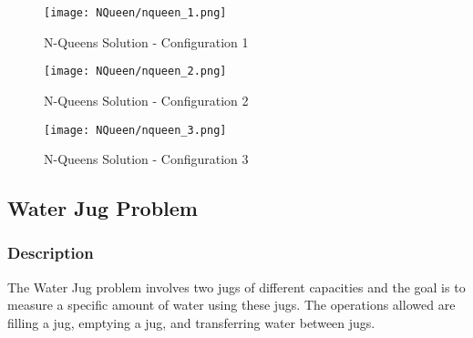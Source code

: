 \documentclass[11pt,a4paper]{article}
\begin{document}
\begin{figure}[H]
    \centering
    \texttt{[image: NQueen/nqueen\_1.png]}
    \caption{N-Queens Solution - Configuration 1}
\end{figure}

\begin{figure}[H]
    \centering
    \texttt{[image: NQueen/nqueen\_2.png]}
    \caption{N-Queens Solution - Configuration 2}
\end{figure}

\begin{figure}[H]
    \centering
    \texttt{[image: NQueen/nqueen\_3.png]}
    \caption{N-Queens Solution - Configuration 3}
\end{figure}

\subsection{Water Jug Problem}

\subsubsection{Description}
The Water Jug problem involves two jugs of different capacities and the goal is to measure a specific amount of water using these jugs. The operations allowed are filling a jug, emptying a jug, and transferring water between jugs.
\end{document}
